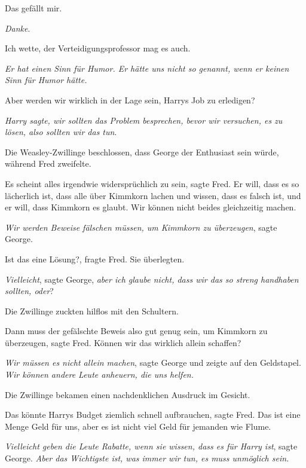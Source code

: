 \glqq{}Das gefällt mir.\grqq{}

\glqq{}\emph{Danke}.\grqq{}

\glqq{}Ich wette, der Verteidigungsprofessor mag es auch.\grqq{}

\glqq{}\emph{Er hat einen Sinn für Humor. Er hätte uns nicht so genannt, wenn er
keinen Sinn für Humor hätte.}\grqq{}

\glqq{}Aber werden wir wirklich in der Lage sein, Harrys Job zu
erledigen?\grqq{}

\glqq{}\emph{Harry sagte, wir sollten das Problem besprechen, bevor wir
versuchen, es zu lösen, also sollten wir das tun}.\grqq{}

Die Weasley-Zwillinge beschlossen, dass George der Enthusiast sein würde,
während Fred zweifelte.

\glqq{}Es scheint alles irgendwie widersprüchlich zu sein\grqq{}, sagte Fred.
\glqq{}Er will, dass es so lächerlich ist, dass alle über Kimmkorn lachen und
wissen, dass es falsch ist, und er will, dass Kimmkorn es glaubt. Wir können
nicht beides gleichzeitig machen.\grqq{}

\glqq{}\emph{Wir werden Beweise fälschen müssen, um Kimmkorn zu
überzeugen}\grqq{}, sagte George.

\glqq{}Ist das eine Lösung?\grqq{}, fragte Fred. Sie überlegten.

\glqq{}\emph{Vielleicht}\grqq{}, sagte George, \glqq{}\emph{aber ich glaube
nicht, dass wir das so streng handhaben sollten, oder}?\grqq{}

Die Zwillinge zuckten hilflos mit den Schultern.

\glqq{}Dann muss der gefälschte Beweis also gut genug sein, um Kimmkorn zu
überzeugen\grqq{}, sagte Fred. \glqq{}Können wir das wirklich allein
schaffen?\grqq{}

\glqq{}\emph{Wir müssen es nicht allein machen}\grqq{}, sagte George und zeigte
auf den Geldstapel. \glqq{}\emph{Wir können andere Leute anheuern, die uns
helfen.}\grqq{}

Die Zwillinge bekamen einen nachdenklichen Ausdruck im Gesicht.

\glqq{}Das könnte Harrys Budget ziemlich schnell aufbrauchen\grqq{}, sagte Fred.
\glqq{}Das ist eine Menge Geld für uns, aber es ist nicht viel Geld für jemanden
wie Flume.\grqq{}

\glqq{}\emph{Vielleicht geben die Leute Rabatte, wenn sie wissen, dass es für
Harry ist}\grqq{}, sagte George. \glqq{}\emph{Aber das Wichtigste ist, was immer
wir tun, es muss unmöglich sein.}\grqq{}

